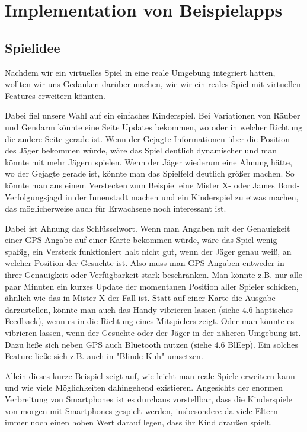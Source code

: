 \section{Implementation von Beispielapps}
\subsection*{Spielidee}
Nachdem wir ein virtuelles Spiel in eine reale Umgebung integriert hatten, wollten wir uns Gedanken darüber machen, wie wir ein reales Spiel mit virtuellen Features erweitern könnten. 

Dabei fiel unsere Wahl auf ein einfaches Kinderspiel. Bei Variationen von Räuber und Gendarm könnte eine Seite Updates bekommen, wo oder in welcher Richtung die andere Seite gerade ist. Wenn der Gejagte Informationen über die Position des Jäger bekommen würde, wäre das Spiel deutlich dynamischer und man könnte mit mehr Jägern spielen. Wenn der Jäger wiederum eine Ahnung hätte, wo der Gejagte gerade ist, könnte man das Spielfeld deutlich größer machen. So könnte man aus einem Verstecken zum Beispiel eine Mister X- oder James Bond-Verfolgungsjagd in der Innenstadt machen und ein Kinderspiel zu etwas machen, das möglicherweise auch für Erwachsene noch interessant ist.

Dabei ist Ahnung das Schlüsselwort. Wenn man Angaben mit der Genauigkeit einer GPS-Angabe auf einer Karte bekommen würde, wäre das Spiel wenig spaßig, ein Versteck funktioniert halt nicht gut, wenn der Jäger genau weiß, an welcher Position der Gesuchte ist. Also muss man GPS Angaben entweder in ihrer Genauigkeit oder Verfügbarkeit stark beschränken. Man könnte z.B. nur alle paar Minuten ein kurzes Update der momentanen Position aller Spieler schicken, ähnlich wie das in Mister X der Fall ist. Statt auf einer Karte die Ausgabe darzustellen, könnte man auch das Handy vibrieren lassen (siehe 4.6 haptisches Feedback), wenn es in die Richtung eines Mitspielers zeigt. Oder man könnte es vibrieren lassen, wenn der Gesuchte oder der Jäger in der näheren Umgebung ist. Dazu ließe sich neben GPS auch Bluetooth nutzen (siehe 4.6 BlEep). Ein solches Feature ließe sich z.B. auch in "Blinde Kuh" umsetzen.

Allein dieses kurze Beispiel zeigt auf, wie leicht man reale Spiele erweitern kann und wie viele Möglichkeiten dahingehend existieren. Angesichts der enormen Verbreitung von Smartphones ist es durchaus vorstellbar, dass die Kinderspiele von morgen mit Smartphones gespielt werden, insbesondere da viele Eltern immer noch einen hohen Wert darauf legen, dass ihr Kind draußen spielt.